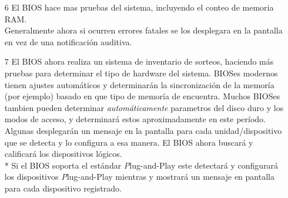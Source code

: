 \begin{enumerate}

	\item[6] El BIOS hace mas pruebas del sistema, incluyendo el conteo de memoria
		RAM. \\
		Generalmente ahora si ocurren errores fatales se los desplegara en la
		pantalla en vez de una notificación auditiva.


	\item[7] El BIOS ahora realiza un sistema de inventario de sorteos, haciendo
		más pruebas para determinar el tipo de hardware del sistema.
		BIOSes modernos tienen ajustes automáticos y determinarán la sincronización
		de la memoría (por ejemplo) basado en que tipo de memoría de encuentra.
		Muchos BIOSes tambien pueden determinar {\em automáticamente} parametros
		del disco duro y los modos de acceso, y determinará estos aproximadamente
		en este período.
		Algunas desplegarán un mensaje en la pantalla para cada unidad/dispositivo que
		se detecta y lo configura a esa manera. El BIOS ahora buscará y calificará los
		dispositivos lógicos. \\*
		Si el BIOS soporta el estándar {\emph Plug-and-Play }\cite{plugandplay} este detectará
		y configurará los dispositivos {\emph Plug-and-Play} mientras y mostrará un mensaje
		en pantalla para cada dispositivo registrado.
	


\end{enumerate}
